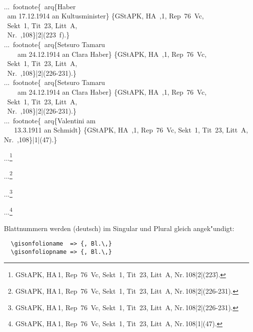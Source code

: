 \documentclass[12pt,a4paper]{article}
\newcommand{\pbs}{\string\ \unskip}
\newcommand{\bs}{\protect\pbs}
\begin{document}
\Doppelbox
{\strut\\[-2ex]
...\bs footnote\{\bs arq\{Haber 
\\ \ am 17.12.1914 an 
Kultusminister\} \{GStAPK, HA\bs ,1, Rep\string~76\string~Vc, 
\\ \ Sekt\string~1, 
Tit\string~23, Litt\string~A, 
\\ \ Nr.\bs ,108\}\string|2\string|(223\bs f).\}
\\[1ex]
...\bs footnote\{\bs arq\{Setsuro Tamaru 
\\ \ \ \ \ am 24.12.1914 an 
Clara Haber\} \{GStAPK, HA\bs ,1, Rep\string~76\string~Vc, 
\\ \ Sekt\string~1, 
Tit\string~23, Litt\string~A, 
\\ \ Nr.\bs ,108\}\string|2\string|(226-231).\}
\\[1ex]
...\bs footnote\{\bs arq\{Setsuro Tamaru 
\\ \ \ \ \ am 24.12.1914 an 
Clara Haber\} \{GStAPK, HA\bs ,1, Rep\string~76\string~Vc, 
\\ \ Sekt\string~1, 
Tit\string~23, Litt\string~A, 
\\ \ Nr.\bs ,108\}\string|2\string|(226-231).\}
\\[1ex]
...\bs footnote\{\bs arq\{Valentini am 
\\ \ \ \ 13.3.1911 an Schmidt\} \{GStAPK, 
HA\bs ,1, Rep\string~76\string~Vc, Sekt\string~1, Tit\string~23, Litt\string~A, 
Nr.\bs ,108\}\string|1\string|(47).\}
\\[-2.25ex]\strut
}
{
...\footnote{ {GStAPK, HA\,1, Rep~76~Vc, Sekt~1, 
Tit~23, Litt~A, Nr.\,108}|2|(223\f).}

...\footnote{ {GStAPK, HA\,1, Rep~76~Vc, Sekt~1, 
Tit~23, Litt~A, Nr.\,108}|2|(226-231).}

...\footnote{ {GStAPK, HA\,1, Rep~76~Vc, Sekt~1, 
Tit~23, Litt~A, Nr.\,108}|2|(226-231).}

...\footnote{ 
{GStAPK, HA\,1, Rep~76~Vc, Sekt~1, Tit~23, Litt~A, 
Nr.\,108}|1|(47).} 
}

\vspace{-.25ex}\noindent
Blattnummern werden (deutsch) im Singular und Plural gleich angek"undigt:

\vspace{-.5ex}
{\small
\begin{verbatim}
  \gisonfolioname  => {, Bl.\,}
  \gisonfoliopname => {, Bl.\,}
\end{verbatim}}
\end{document}
